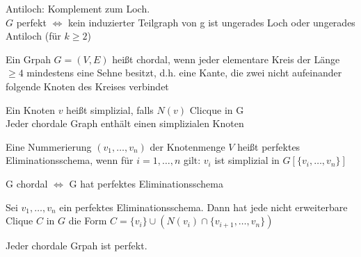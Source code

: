 \documentclass[14pt]{article}
\begin{document}
Antiloch: Komplement zum Loch. \\
$G$ perfekt $\Leftrightarrow$ kein induzierter Teilgraph von g 
ist ungerades Loch oder ungerades Antiloch (für $k \geq 2$)
\begin{definition}[Chordal]
    Ein Grpah $G = (V, E)$ heißt chordal, wenn jeder elementare Kreis
    der Länge $\geq 4$ mindestens eine Sehne besitzt, d.h. eine Kante, die 
    zwei nicht aufeinander folgende Knoten des Kreises verbindet
\end{definition}
\begin{definition}
    Ein Knoten $v$ heißt simplizial, falls $N(v)$ Clicque in G \\
    Jeder chordale Graph enthält einen simplizialen Knoten
\end{definition}
\begin{definition}
    Eine Nummerierung $(v_1, \dots, v_n)$ der Knotenmenge $V$ heißt perfektes
    Eliminationsschema, wenn für $i = 1, \dots, n$ gilt: $v_i$ ist simplizial
    in $G[\{v_i, \dots, v_n\}]$
\end{definition}
\begin{eigenschaft}
    G chordal $\Leftrightarrow$ G hat perfektes Eliminationsschema 
\end{eigenschaft}
\begin{eigenschaft}
    Sei $v_1, \dots, v_n$ ein perfektes Eliminationsschema. Dann hat
    jede nicht erweiterbare Clique $C$ in $G$ die Form 
    $C = \{ v_i\} \cup (N(v_i) \cap \{ v_{i+ 1}, \dots, v_n \})$
\end{eigenschaft}
\begin{eigenschaft}
    Jeder chordale Grpah ist perfekt.
\end{eigenschaft}
\end{document}
